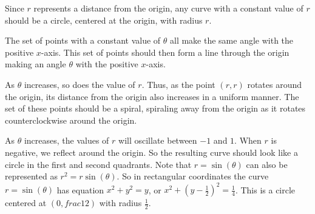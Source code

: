 \begin{activitySolution}
	\ba
	\item Since $r$ represents a distance from the origin, any curve with a constant value of $r$ should be a circle, centered at the origin, with radius $r$. 

	\item The set of points with a constant value of $\theta$ all make the same angle with the positive $x$-axis. This set of points should then form a line through the origin making an angle $\theta$ with the positive $x$-axis.  
		
	\item As $\theta$ increases, so does the value of $r$. Thus, as the point $(r,r)$ rotates around the origin, its distance from the origin also increases in a uniform manner. The set of these points should be a spiral, spiraling away from the origin as it rotates counterclockwise around the origin. 	

    \item As $\theta$ increases, the values of $r$ will oscillate between $-1$ and $1$. When $r$ is negative, we reflect around the origin. So the resulting curve should look like a circle in the first and second quadrants. Note that $r=\sin(\theta)$ can also be represented as $r^2 = r\sin(\theta)$. So in rectangular coordinates the curve $r=\sin(\theta)$ has equation $x^2+y^2 = y$, or $x^2 + \left(y-\frac{1}{2}\right)^2 = \frac{1}{4}$. This is a circle  centered at $\left(0,frac{1}{2}\right)$ with radius $\frac{1}{2}$.   

    	
	\ea
\end{activitySolution}
\aftera
